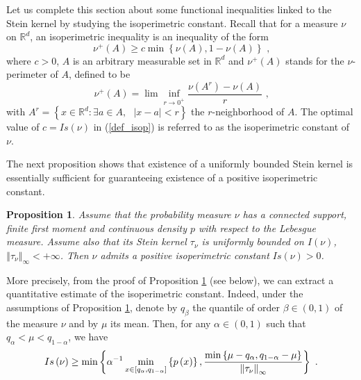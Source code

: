 \documentclass[11pt]{article}
\newtheorem{proposition}[theorem]{Proposition}
\begin{document}
Let us complete this section about some functional inequalities linked to
the Stein kernel by studying the isoperimetric constant. Recall that for a
measure $\nu $ on $\mathbb{R}^{d}$, an isoperimetric inequality is an
inequality of the form%
\begin{equation}
\nu ^{+}\left( A\right) \geq c\min \left\{ \nu \left( A\right) ,1-\nu \left(
A\right) \right\} \text{ ,}  \label{def_isop}
\end{equation}%
where $c>0$, $A$ is an arbitrary measurable set in $\mathbb{R}^{d}$ and $\nu
^{+}\left( A\right) $ stands for the $\nu $-perimeter of $A$, defined to be%
\begin{equation*}
\nu ^{+}\left( A\right) =\lim \inf_{r\rightarrow 0^{+}}\frac{\nu \left(
A^{r}\right) -\nu \left( A\right) }{r}\text{ ,}
\end{equation*}%
with $A^{r}=\left\{ x\in \mathbb{R}^{d}:\exists a\in A,\text{ }\left\vert
x-a\right\vert <r\right\} $ the $r$-neighborhood of $A$. The optimal value
of $c=Is\left( \nu \right) $ in (\ref{def_isop}) is referred to as the
isoperimetric constant of $\nu $.

The next proposition shows that existence of a uniformly bounded Stein
kernel is essentially sufficient for guaranteeing existence of a positive
isoperimetric constant.

\begin{proposition}
\label{prop_isop}Assume that the probability measure $\nu $ has a connected
support, finite first moment and continuous density $p$ with respect to the
Lebesgue measure. Assume also that its Stein kernel $\tau _{\nu }$ is
uniformly bounded on $I\left( \nu \right) $, $\left\Vert \tau _{\nu
}\right\Vert _{\infty }<+\infty $. Then $\nu $ admits a positive
isoperimetric constant $Is\left( \nu \right) >0$.
\end{proposition}

More precisely, from the proof of Proposition \ref{prop_isop} (see below),
we can extract a quantitative estimate of the isoperimetric constant.
Indeed, under the assumptions of Proposition \ref{prop_isop}, denote by $%
q_{\beta }$ the quantile of order $\beta \in \left( 0,1\right) $ of the
measure $\nu $ and by $\mu $ its mean. Then, for any $\alpha \in \left(
0,1\right) $ such that $q_{\alpha }<\mu <q_{1-\alpha }$, we have%
\begin{equation*}
Is\left( \nu \right) \geq \min \left\{ \alpha ^{-1}\min_{x\in \left[
q_{\alpha },q_{1-\alpha }\right] }\left\{ p\left( x\right) \right\} ,\frac{%
\min \left\{ \mu -q_{\alpha },q_{1-\alpha }-\mu \right\} }{\left\Vert \tau
_{\nu }\right\Vert _{\infty }}\right\} \text{ .}
\end{equation*}
\end{document}
